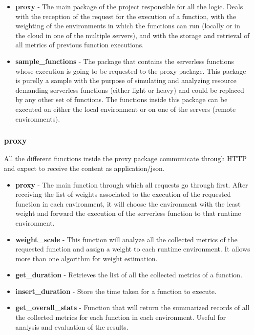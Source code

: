 \documentclass[conference]{IEEEtran}
\begin{document}
\begin{itemize}
    \item \textbf{proxy} - The main package of the project responsible for
        all the logic. Deals with the reception of the request for the execution
        of a function, with the weighting of the environments in which the
        functions can run (locally or in the cloud in one of the multiple
        servers), and with the storage and retrieval of all metrics of previous
        function executions. 
    \item \textbf{sample\_functions} - The package that contains the serverless functions
        whose execution is going to be requested to the proxy package. This
        package is purelly a sample with the purpose of simulating and analyzing
        resource demanding serverless functions (either light or heavy) and could be replaced
        by any other set of functions. The functions inside this package can be
        executed on either the local environment or on one of the servers (remote
        environments).
\end{itemize}

\subsubsection*{proxy}


All the different functions inside the proxy package communicate through HTTP and
expect to receive the content as application/json.

\begin{itemize}
    \item \textbf{proxy} - The main function through which all requests go through
        first. After receiving the list of weights associated to the execution of
        the requested function in each environment, it will choose the environment
        with the least weight and forward the execution of the serverless function
        to that runtime environment.
    \item \textbf{weight\_scale} - This function will analyze all the collected 
        metrics of the requested function and assign a weight to each runtime
        environment. It allows more than one algorithm for weight estimation.
    \item \textbf{get\_duration} - Retrieves the list of all the collected
        metrics of a function.
    \item \textbf{insert\_duration} - Store the time taken for a function to
        execute.
    \item \textbf{get\_overall\_stats} - Function that will return the summarized
        records of all the collected metrics for each function in each
        environment. Useful for analysis and evaluation of the results.
\end{itemize}
\end{document}

